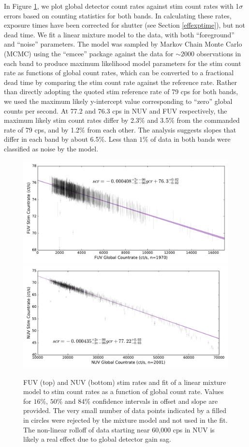 \documentclass[preprint]{aastex}
\begin{document}
In Figure \ref{stim}, we plot global detector count rates against stim count rates with 1$\sigma$ errors based on counting statistics for both bands. In calculating these rates, exposure times have been corrected for shutter (see Section \ref{effexptime}), but not dead time. We fit a linear mixture model to the data, with both ``foreground'' and ``noise'' parameters. The model was sampled by Markov Chain Monte Carlo (MCMC) using the ``emcee'' package \citep{for2013} against the data for $\sim 2000$ observations in each band to produce maximum likelihood model parameters for the stim count rate as functions of global count rates, which can be converted to a fractional dead time by comparing the stim count rate against the reference rate. Rather than directly adopting the quoted stim reference rate of 79 cps for both bands, we used the maximum likely y-intercept value corresponding to ``zero'' global counts per second. At 77.2 and 76.3 cps in NUV and FUV respectively, the maximum likely stim count rates differ by 2.3\% and 3.5\% from the commanded rate of 79 cps, and by 1.2\% from each other. The analysis suggests slopes that differ in each band by about 6.5\%. Less than $1\%$ of data in both bands were classified as noise by the model.

\clearpage
\begin{figure}[h]
\includegraphics[scale=0.65]{Fig10a.pdf}\\
\includegraphics[scale=0.65]{Fig10b.pdf}
\caption{FUV (top) and NUV (bottom) stim rates and fit of a linear mixture model to stim count rates as a function of global count rate. Values for $16\%$, $50\%$ and $84\%$ confidence intervals in offset and slope are provided. The very small number of data points indicated by a filled in circles were rejected by the mixture model and not used in the fit. The non-linear rolloff of data starting near 60,000 cps in NUV is likely a real effect due to global detector gain sag.
\label{stim}}
\end{figure}
\clearpage
\end{document}

